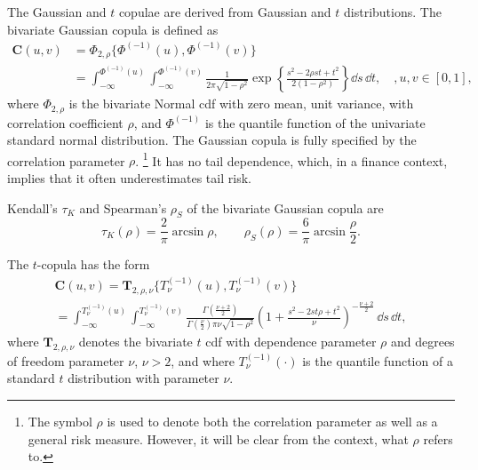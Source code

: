 The Gaussian and $t$ copulae are derived from Gaussian and $t$
distributions. 
The bivariate Gaussian copula is defined as
\begin{align*}
  \bm{C}(u,v) &= \Phi_{2, \rho}\{\Phi^{(-1)}(u), \Phi^{(-1)}(v)\} \nonumber \\
              &= \int_{-\infty}^{\Phi^{(-1)}(u)}
                \int_{-\infty}^{\Phi^{(-1)}(v)}
                \frac{1}{2\pi\sqrt{1-\rho^2}}
                \exp{\left\{
                \frac{s^2-2\rho st+t^2}{2(1-\rho^2)}
                \right\}} \dd s\, \dd t,\quad, u,v\in [0,1],
\end{align*}
where $\Phi_{2, \rho}$ is the bivariate Normal cdf
with zero mean, unit variance, with correlation coefficient $\rho$, and
$\Phi^{(-1)}$ is the quantile function of the univariate standard normal
distribution.
The Gaussian copula is fully specified by the correlation parameter $\rho$. \footnote{
The symbol $\rho$ is used to denote both the correlation parameter as
well as a general risk measure. However, it will be clear from the
context, what $\rho$ refers to.}
It has no tail dependence, which, in a finance context, implies that
it often underestimates tail risk.  


Kendall's $\tau_K$ and Spearman's $\rho_S$ of the bivariate Gaussian copula are
    \begin{equation*}
        \tau_K(\rho) = \frac{2}{\pi}\arcsin\rho, \quad\quad
        \rho_S(\rho) = \frac{6}{\pi}\arcsin\frac{\rho}{2}.
        \end{equation*}

The $t$-copula has the form
\begin{multline*}
        \bm{C}(u,v) = \bm{T}_{2, \rho, \nu}\{T^{(-1)}_\nu(u), T^{(-1)}_\nu(v)\}\\
        = \int_{-\infty}^{T^{(-1)}_\nu(u)}
               \int_{-\infty}^{T^{(-1)}_\nu(v)}
            \frac{\Gamma\left(\frac{\nu+2}{2}\right)}
            {\Gamma\left(\frac{\nu}{2}\right)\pi\nu\sqrt{1-\rho^2}}
             \left(
        1+\frac{s^2-2st\rho+t^2}{\nu}
        \right)^{-\frac{\nu+2}{2}}\, \dd s\, \dd t,
    \end{multline*}
where $\bm{T}_{2, \rho, \nu}$ denotes the 
bivariate $t$ cdf with dependence parameter $\rho$ and degrees of
freedom parameter $\nu$, $\nu>2$,
and where $T^{(-1)}_\nu(\cdot)$ is the quantile function of a standard
$t$ distribution with parameter $\nu$. 

